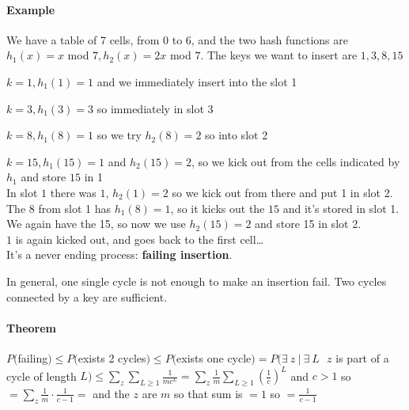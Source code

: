 \documentclass[10pt]{report}
\begin{document}
\paragraph{Example}  We have a table of 7 cells, from $0$ to $6$, and the two hash functions are $h_1(x)=x$ mod $7, h_2(x) = 2x$ mod $7$. The keys we want to insert are $1,3,8,15$
\begin{list}{}{}
	\item $k=1, h_1(1) = 1$ and we immediately insert into the slot 1
	\item $k=3, h_1(3) = 3$ so immediately in slot 3
	\item $k=8, h_1(8) = 1$ so we try $h_2(8) = 2$ so into slot 2
	\item $k=15, h_1(15) = 1$ and $h_2(15) = 2$, so we kick out from the cells indicated by $h_1$ and store $15$ in 1\\
	In slot $1$ there was $1$, $h_2(1) = 2$ so we kick out from there and put 1 in slot 2.\\
	The $8$ from slot 1 has $h_1(8) = 1$, so it kicks out the $15$ and it's stored in slot 1.\\
	We again have the 15, so now we use $h_2(15) = 2$ and store 15 in slot 2.\\
	$1$ is again kicked out, and goes back to the first cell\ldots\\
	It's a never ending process: \textbf{failing insertion}.
\end{list}
In general, one single cycle is not enough to make an insertion fail. Two cycles connected by a key are sufficient.
\paragraph{Theorem} $P($failing$) \leq P($exists 2 cycles$) \leq P($exists one cycle$) = P(\exists\:z\:|\:\exists\:L\:\:\:z$ is part of a cycle of length $L) \leq \sum_{z}\sum_{L\geq 1} \frac{1}{mc^L} = \sum_z\frac{1}{m}\sum_{L\geq 1}\left(\frac{1}{c}\right)^L$ and $c>1$ so $= \sum_z\frac{1}{m}\cdot \frac{1}{c-1} =$ and the $z$ are $m$ so that sum is $=1$ so $= \frac{1}{c-1}$ 
\end{document}
